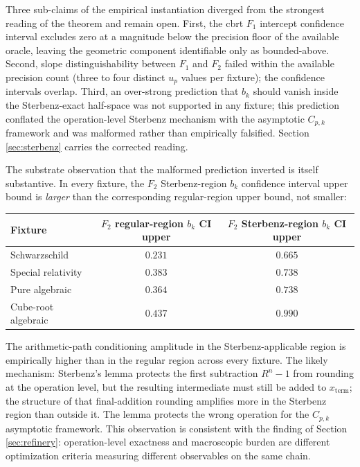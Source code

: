 \documentclass[11pt,a4paper]{article}
\begin{document}
Three sub-claims of the empirical instantiation diverged from the strongest reading of the theorem and remain open. First, the cbrt $F_1$ intercept confidence interval excludes zero at a magnitude below the precision floor of the available oracle, leaving the geometric component identifiable only as bounded-above. Second, slope distinguishability between $F_1$ and $F_2$ failed within the available precision count (three to four distinct $u_p$ values per fixture); the confidence intervals overlap. Third, an over-strong prediction that $b_k$ should vanish inside the Sterbenz-exact half-space was not supported in any fixture; this prediction conflated the operation-level Sterbenz mechanism with the asymptotic $C_{p,k}$ framework and was malformed rather than empirically falsified. Section \ref{sec:sterbenz} carries the corrected reading.

The substrate observation that the malformed prediction inverted is itself substantive. In every fixture, the $F_2$ Sterbenz-region $b_k$ confidence interval upper bound is \emph{larger} than the corresponding regular-region upper bound, not smaller:

\begin{center}
\begin{tabular}{lcc}
\toprule
Fixture & $F_2$ regular-region $b_k$ CI upper & $F_2$ Sterbenz-region $b_k$ CI upper \\
\midrule
Schwarzschild & $0.231$ & $0.665$ \\
Special relativity & $0.383$ & $0.738$ \\
Pure algebraic & $0.364$ & $0.738$ \\
Cube-root algebraic & $0.437$ & $0.990$ \\
\bottomrule
\end{tabular}
\end{center}

The arithmetic-path conditioning amplitude in the Sterbenz-applicable region is empirically higher than in the regular region across every fixture. The likely mechanism: Sterbenz's lemma protects the first subtraction $R^n - 1$ from rounding at the operation level, but the resulting intermediate must still be added to $x_{\mathrm{term}}$; the structure of that final-addition rounding amplifies more in the Sterbenz region than outside it. The lemma protects the wrong operation for the $C_{p,k}$ asymptotic framework. This observation is consistent with the finding of Section \ref{sec:refinery}: operation-level exactness and macroscopic burden are different optimization criteria measuring different observables on the same chain.
\end{document}
